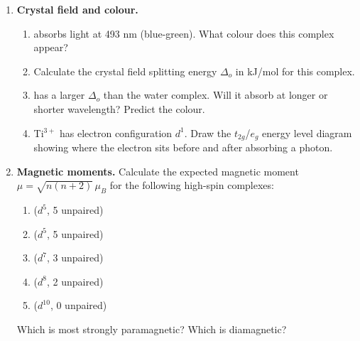 \documentclass[12pt, a4paper]{book}
\begin{document}
\begin{problembox}
\begin{enumerate}[label=\textbf{\arabic*.}]
  \item \textbf{Crystal field and colour.}
        \begin{enumerate}[label=(\alph*)]
          \item {} absorbs light at 493 nm
                (blue-green). What colour does this complex appear?
          \item Calculate the crystal field splitting energy
                $\Delta_o$ in kJ/mol for this complex.
          \item {} has a larger $\Delta_o$
                than the water complex.
                Will it absorb at longer or shorter wavelength?
                Predict the colour.
          \item Ti$^{3+}$ has electron configuration $d^1$.
                Draw the $t_{2g}$/$e_g$ energy level diagram
                showing where the electron sits before and
                after absorbing a photon.
        \end{enumerate}

  \item \textbf{Magnetic moments.}
        Calculate the expected magnetic moment $\mu = \sqrt{n(n+2)}\,\mu_B$
        for the following high-spin complexes:
        \begin{enumerate}[label=(\alph*)]
          \item {} ($d^5$, 5 unpaired)
          \item {} ($d^5$, 5 unpaired)
          \item {} ($d^7$, 3 unpaired)
          \item {} ($d^8$, 2 unpaired)
          \item {} ($d^{10}$, 0 unpaired)
        \end{enumerate}
        Which is most strongly paramagnetic?
        Which is diamagnetic?


\end{enumerate}
\end{problembox}
\end{document}
